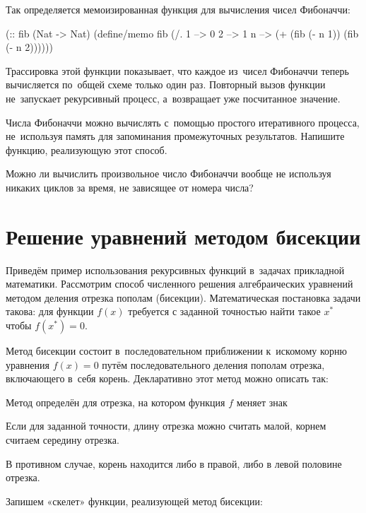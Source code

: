 Так определяется мемоизированная функция для вычисления чисел Фибоначчи:
\begin{Definition}
(:: fib  (Nat -> Nat)
  (define/memo fib
    (/. 1 --> 0
        2 --> 1
        n --> (+ (fib (- n 1)) 
                 (fib (- n 2))))))
\end{Definition}

Трассировка этой функции показывает, что каждое из~чисел Фибоначчи теперь вычисляется по~общей схеме только один раз. Повторный вызов функции  не~запускает рекурсивный процесс, а~возвращает уже посчитанное значение.

\newpage
\begin{Assignment}

Числа Фибоначчи можно вычислять с~помощью простого итеративного процесса, не~используя память для запоминания промежуточных результатов. Напишите функцию, реализующую этот способ.

Можно ли вычислить произвольное число Фибоначчи вообще не используя никаких циклов за время, не зависящее от номера числа?
\end{Assignment}

\section{Решение уравнений методом бисекции}%
Приведём пример использования рекурсивных функций в~задачах прикладной математики. Рассмотрим способ численного решения алгебраических уравнений методом деления отрезка пополам (бисекции). Математическая постановка задачи такова: для функции $f(x)$ требуется с заданной точностью найти такое $x^*$ чтобы $f(x^*) = 0$.

\label{bisection}Метод бисекции состоит в~последовательном приближении к~искомому корню уравнения $f(x) = 0$ путём последовательного деления пополам отрезка, включающего в~себя корень. Декларативно этот метод можно описать так:

\begin{Algorythm}
  \item Метод определён для отрезка, на котором функция $f$ меняет знак
  \item Если для заданной точности, длину отрезка можно считать малой, корнем считаем середину отрезка.
  \item В противном случае, корень находится либо в правой, либо в левой половине отрезка.
\end{Algorythm}

Запишем «скелет» функции, реализующей метод бисекции:

